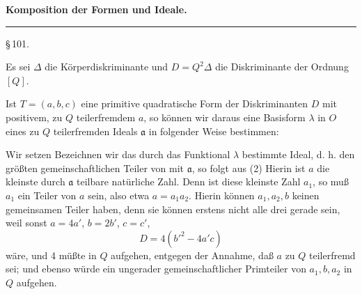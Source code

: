 \begin{center}

\textbf{Komposition der Formen und Ideale.}

\rule{0.2\linewidth}{0.4pt}

\S\,101. 
\end{center}

Es sei $\Delta$ die K\"orperdiskriminante und $D = Q^2\Delta$ die Diskriminante der Ordnung $[Q]$.

Ist $T = (a, b, c)$ eine primitive quadratische Form der Diskriminanten $D$ %
mit positivem, zu $Q$ teilerfremdem $a$, so k\"onnen wir daraus eine Basisform $\lambda$ in $O$ eines zu $Q$ teilerfremden Ideals $\mathfrak{a}$ in folgender Weise bestimmen:

Wir setzen
Bezeichnen wir das durch das Funktional $\lambda$ bestimmte Ideal, d. h. den gr\"o\ss ten gemeinschaftlichen Teiler von
mit $\mathfrak{a}$, so folgt aus (2)
Hierin ist $a$ die kleinste durch $\mathfrak{a}$ teilbare nat\"urliche Zahl. Denn ist diese kleinste Zahl $a_1$, so mu\ss{} $a_1$ ein Teiler von $a$ sein, also etwa $a = a_1 a_2$. Hierin k\"onnen $a_1, a_2, b$ keinen gemeinsamen Teiler haben, denn sie k\"onnen erstens nicht alle drei gerade sein, weil sonst $a = 4a'$, $b = 2b'$, $c = c'$,
\[
D = 4(b'^2 - 4a'c)
\]
w\"are, und 4 m\"u\ss te in $Q$ aufgehen, entgegen der Annahme, da\ss{} $a$ zu $Q$ teilerfremd sei; und ebenso w\"urde ein ungerader gemeinschaftlicher Primteiler von $a_1, b, a_2$ in $Q$ aufgehen.
